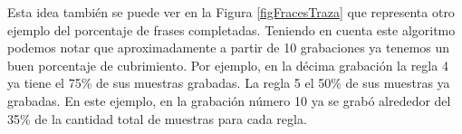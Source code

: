 Esta idea también se puede ver en la Figura \ref{figFracesTraza} que representa otro ejemplo del porcentaje de frases completadas. Teniendo en cuenta este algoritmo podemos notar que aproximadamente a partir de 10 grabaciones ya tenemos un buen porcentaje de cubrimiento. Por ejemplo, en la décima grabación la regla 4 ya tiene el 75\% de sus muestras grabadas. La regla 5 el 50\% de sus muestras ya grabadas. En este ejemplo, en la grabación número 10 ya se grabó alrededor del 35\% de la cantidad total de muestras para cada regla.


